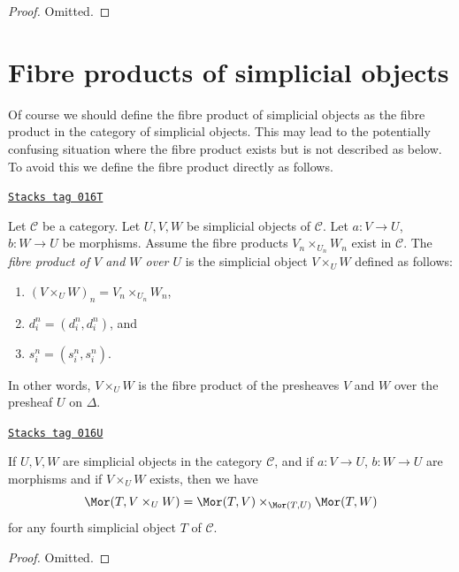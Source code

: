 \begin{proof}
Omitted.
\end{proof}

\section{Fibre products of simplicial objects}
\label{simplicial-section-fibre-products}
Of course we should define the fibre product of simplicial objects
as the fibre product in the category of simplicial objects. This
may lead to the potentially confusing situation where the
fibre product exists but is not described as below. To avoid
this we define the fibre product directly as follows.

\begin{definition}
\label{simplicial-definition-fibre-product}
\href{https://stacks.math.columbia.edu/tag/016T}{\texttt{Stacks tag 016T}}

Let $\mathcal{C}$ be a category.
Let $U, V, W$ be simplicial objects of $\mathcal{C}$.
Let $a : V \to U$, $b : W \to U$ be morphisms.
Assume the fibre products $V_n \times_{U_n} W_n$ exist in $\mathcal{C}$.
The {\it fibre product of $V$ and $W$ over $U$} is the simplicial object
$V \times_U W$ defined as follows:
\begin{enumerate}
\item $(V \times_U W)_n = V_n \times_{U_n} W_n$,
\item $d^n_i = (d^n_i, d^n_i)$, and
\item $s^n_i = (s^n_i, s^n_i)$.
\end{enumerate}
In other words, $V \times_U W$ is the fibre product of the presheaves
$V$ and $W$ over the presheaf $U$ on $\Delta$.
\end{definition}

\begin{lemma}
\label{simplicial-lemma-fibre-product}
\href{https://stacks.math.columbia.edu/tag/016U}{\texttt{Stacks tag 016U}}

If $U, V, W$ are simplicial objects in the category $\mathcal{C}$,
and if $a : V \to U$, $b : W \to U$ are morphisms
and if $V \times_U W$ exists, then we have
$$
\Mor(T, V \times_U W) =
\Mor(T, V) \times_{\Mor(T, U)}
\Mor(T, W)
$$
for any fourth simplicial object $T$ of $\mathcal{C}$.
\end{lemma}

\begin{proof}
Omitted.
\end{proof}


